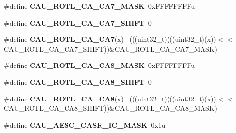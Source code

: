 \begin{DoxyCompactItemize}
\item 
\hypertarget{group___c_a_u___register___masks_gadd2dfc00072ea9bfc8693db4bdf349c0}{}\#define {\bfseries C\+A\+U\+\_\+\+R\+O\+T\+L\+\_\+\+C\+A\+\_\+\+C\+A7\+\_\+\+M\+A\+S\+K}~0x\+F\+F\+F\+F\+F\+F\+F\+Fu\label{group___c_a_u___register___masks_gadd2dfc00072ea9bfc8693db4bdf349c0}

\item 
\hypertarget{group___c_a_u___register___masks_ga6fc3bc4fdde8ba6f026800de3795b23f}{}\#define {\bfseries C\+A\+U\+\_\+\+R\+O\+T\+L\+\_\+\+C\+A\+\_\+\+C\+A7\+\_\+\+S\+H\+I\+F\+T}~0\label{group___c_a_u___register___masks_ga6fc3bc4fdde8ba6f026800de3795b23f}

\item 
\hypertarget{group___c_a_u___register___masks_ga06f912b3e1336435854401e6ddc8a9c8}{}\#define {\bfseries C\+A\+U\+\_\+\+R\+O\+T\+L\+\_\+\+C\+A\+\_\+\+C\+A7}(x)                                          ~(((uint32\+\_\+t)(((uint32\+\_\+t)(x))$<$$<$C\+A\+U\+\_\+\+R\+O\+T\+L\+\_\+\+C\+A\+\_\+\+C\+A7\+\_\+\+S\+H\+I\+F\+T))\&C\+A\+U\+\_\+\+R\+O\+T\+L\+\_\+\+C\+A\+\_\+\+C\+A7\+\_\+\+M\+A\+S\+K)\label{group___c_a_u___register___masks_ga06f912b3e1336435854401e6ddc8a9c8}

\item 
\hypertarget{group___c_a_u___register___masks_ga4453f2b5a0d2dd265cf121960804c8a7}{}\#define {\bfseries C\+A\+U\+\_\+\+R\+O\+T\+L\+\_\+\+C\+A\+\_\+\+C\+A8\+\_\+\+M\+A\+S\+K}~0x\+F\+F\+F\+F\+F\+F\+F\+Fu\label{group___c_a_u___register___masks_ga4453f2b5a0d2dd265cf121960804c8a7}

\item 
\hypertarget{group___c_a_u___register___masks_ga36c108071b9cf5eef7d56d3b6c5bfbf8}{}\#define {\bfseries C\+A\+U\+\_\+\+R\+O\+T\+L\+\_\+\+C\+A\+\_\+\+C\+A8\+\_\+\+S\+H\+I\+F\+T}~0\label{group___c_a_u___register___masks_ga36c108071b9cf5eef7d56d3b6c5bfbf8}

\item 
\hypertarget{group___c_a_u___register___masks_ga1f767007d96d46c2ea25744f832adade}{}\#define {\bfseries C\+A\+U\+\_\+\+R\+O\+T\+L\+\_\+\+C\+A\+\_\+\+C\+A8}(x)                                          ~(((uint32\+\_\+t)(((uint32\+\_\+t)(x))$<$$<$C\+A\+U\+\_\+\+R\+O\+T\+L\+\_\+\+C\+A\+\_\+\+C\+A8\+\_\+\+S\+H\+I\+F\+T))\&C\+A\+U\+\_\+\+R\+O\+T\+L\+\_\+\+C\+A\+\_\+\+C\+A8\+\_\+\+M\+A\+S\+K)\label{group___c_a_u___register___masks_ga1f767007d96d46c2ea25744f832adade}

\item 
\hypertarget{group___c_a_u___register___masks_ga1cdbe3e5dcccfef7d740aa8474df5263}{}\#define {\bfseries C\+A\+U\+\_\+\+A\+E\+S\+C\+\_\+\+C\+A\+S\+R\+\_\+\+I\+C\+\_\+\+M\+A\+S\+K}~0x1u\label{group___c_a_u___register___masks_ga1cdbe3e5dcccfef7d740aa8474df5263}


\end{DoxyCompactItemize}
